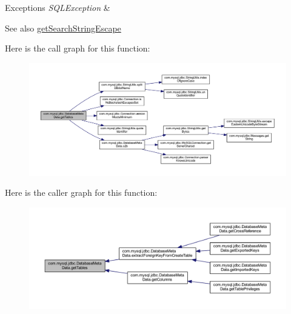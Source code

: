 \begin{DoxyExceptions}{Exceptions}
{\em S\+Q\+L\+Exception} & \\
\hline
\end{DoxyExceptions}
\begin{DoxySeeAlso}{See also}
\mbox{\hyperlink{classcom_1_1mysql_1_1jdbc_1_1_database_meta_data_a210b7942557a965c3af550074bb6fe9d}{get\+Search\+String\+Escape}} 
\end{DoxySeeAlso}
Here is the call graph for this function\+:
\nopagebreak
\begin{figure}[H]
\begin{center}
\leavevmode
\includegraphics[width=350pt]{classcom_1_1mysql_1_1jdbc_1_1_database_meta_data_a09e2c74e6c817b349d43feea682eed58_cgraph}
\end{center}
\end{figure}
Here is the caller graph for this function\+:
\nopagebreak
\begin{figure}[H]
\begin{center}
\leavevmode
\includegraphics[width=350pt]{classcom_1_1mysql_1_1jdbc_1_1_database_meta_data_a09e2c74e6c817b349d43feea682eed58_icgraph}
\end{center}
\end{figure}
\mbox{\label{classcom_1_1mysql_1_1jdbc_1_1_database_meta_data_afbd77b1301f7cfe5feb6f0b6e44ba44e}} 
